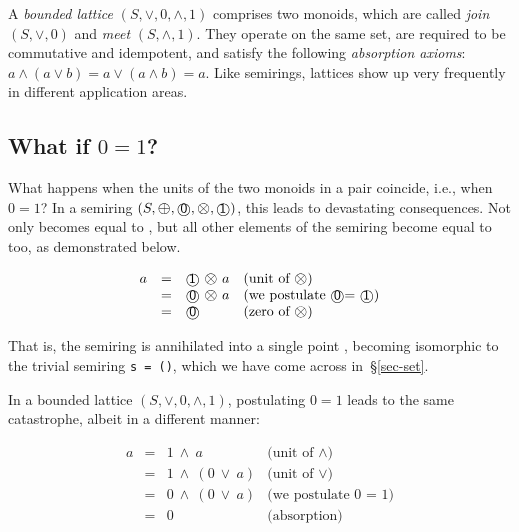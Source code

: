 \documentclass[crc,english]{programming}
\newcommand{\hcode}[1]{{\color{darkblue} \lstinline[keywordstyle={}]|#1|}} %
\newcommand{\add}{\text{\raisebox{-0.1mm}{\large $\oplus$}}}
\newcommand{\mul}{\text{\raisebox{-0.1mm}{\large $\otimes$}}}
\newcommand{\zero}{\raisebox{-0.2mm}{\textcircled{\textsf{0}}}\xspace}
\newcommand{\one}{\raisebox{-0.2mm}{\textcircled{\textsf{\hspace{-0.2mm}1}}}\xspace}
\begin{document}
A \emph{bounded lattice} $(S, \vee, 0, \wedge, 1)$ comprises two monoids, which
are called \emph{join} $(S, \vee, 0)$ and \emph{meet} $(S, \wedge, 1)$. They
operate on the same set, are required to be commutative and idempotent, and
satisfy the following \emph{absorption axioms}: $a \wedge (a \vee b) = a \vee (a \wedge b) = a$. Like semirings, lattices show up very frequently in different application
areas.

\subsection{What if $0=1$?}

What happens when the units of the two monoids in a pair coincide, i.e., when
$0=1$?
In a semiring $(S, \add, \zero, \mul, \one)$, this leads to devastating
consequences. Not only \one becomes equal to \zero, but all other elements of
the semiring become equal to \zero too, as demonstrated below.

\vspace{-5mm}
\begin{equation*}
\begin{array}{rcll}
a & = & \one\ \mul\ a & \text{(unit of $\mul$)}\\
 & = & \zero\ \mul\ a & \text{(we postulate \zero = \one)}\\
 & = & \zero & \text{(zero of $\mul$)}
\end{array}
\end{equation*}
\vspace{-3mm}

\noindent
That is, the semiring is annihilated into a single point \zero, becoming
isomorphic to the trivial semiring \hcode{s = ()}, which we have come across
in~\S\ref{sec-set}.

In a bounded lattice $(S, \vee, 0, \wedge, 1)$, postulating $0 = 1$ leads to the
same catastrophe, albeit in a different manner:

\vspace{-5mm}
\begin{equation*}
\begin{array}{rcll}
a & = & 1\ \wedge\ a & \text{(unit of $\wedge$)}\\
 & = & 1\ \wedge\ (0\  \vee\  a) & \text{(unit of $\vee$)}\\
 & = & 0\ \wedge\ (0\  \vee\  a) & \text{(we postulate 0 = 1)}\\
 & = & 0 & \text{(absorption)}
\end{array}
\end{equation*}
\vspace{-3mm}
\end{document}
